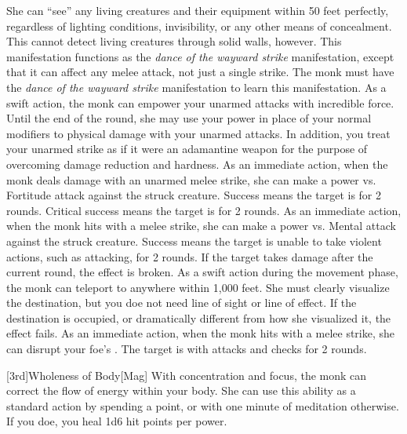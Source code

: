        She can ``see'' any living creatures and their equipment within 50 feet perfectly, regardless of lighting conditions, invisibility, or any other means of concealment.
        This cannot detect living creatures through solid walls, however.
        This \ki manifestation functions as the \textit{dance of the wayward strike} manifestation, except that it can affect any melee attack, not just a single strike.
        The monk must have the \textit{dance of the wayward strike} \ki manifestation to learn this manifestation.
        As a swift action, the monk can empower your unarmed attacks with incredible force.
        Until the end of the round, she may use your \ki power in place of your normal modifiers to physical damage with your unarmed attacks.
        In addition, you treat your unarmed strike as if it were an adamantine weapon for the purpose of overcoming damage reduction and hardness.
        As an immediate action, when the monk deals damage with an unarmed melee strike, she can make a \Ki power vs. Fortitude attack against the struck creature.
        Success means the target is \staggered for 2 rounds.
        Critical success means the target is \stunned for 2 rounds.
        \norepeatnotes
        As an immediate action, when the monk hits with a melee strike, she can make a \Ki power vs. Mental attack against the struck creature.
        Success means the target is unable to take violent actions, such as attacking, for 2 rounds.
        If the target takes damage after the current round, the effect is broken.
        As a swift action during the movement phase, the monk can teleport to anywhere within 1,000 feet.
        She must clearly visualize the destination, but you doe not need line of sight or line of effect.
        If the destination is occupied, or dramatically different from how she visualized it, the effect fails.
        As an immediate action, when the monk hits with a melee strike, she can disrupt your foe's \ki.
        The target is \severelyimpaired with attacks and checks for 2 rounds.

        [3rd]{Wholeness of Body}[Mag]
        With concentration and focus, the monk can correct the flow of energy within your body.
        She can use this ability as a standard action by spending a \ki point, or with one minute of meditation otherwise.
        If you doe, you heal 1d6 hit points per \ki power.

